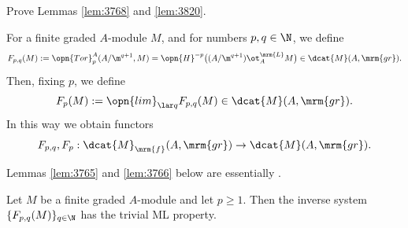 \begin{exer} \label{exer:3765}
Prove Lemmas \ref{lem:3768} and \ref{lem:3820}.
\end{exer}

For a finite graded $A$-module $M$, and for numbers $p, q \in \N$, we 
define \begin{equation} \label{eqn:3765}
F_{p, q}(M) := \opn{Tor}^A_p(A / \m^{q + 1}, M) = 
\opn{H}^{-p} \bigl(  (A / \m^{q + 1})  \ot^{\mrm{L}}_{A} M \bigr) 
\in \dcat{M}(A, \mrm{gr}) . 
\end{equation}
Then, fixing $p$, we define 
\begin{equation} \label{eqn:3766}
F_{p}(M) := \opn{lim}_{\lar q} F_{p, q}(M) \in \dcat{M}(A, \mrm{gr}) . 
\end{equation}
In this way we obtain functors 
\begin{equation} \label{eqn:5202}
F_{p, q}, F_{p} : \dcat{M}_{\mrm{f}}(A, \mrm{gr}) \to \dcat{M}(A, \mrm{gr}) .
\end{equation}

Lemmas \ref{lem:3765} and \ref{lem:3766} below are essentially
\cite[Lemma 6.4 and Proposition 6.5]{WuZh}. 

\begin{lem} \label{lem:3765}
Let $M$ be a finite graded $A$-module and let $p \geq 1$. Then the 
inverse system $\{ F_{p, q}(M) \}_{q \in \N}$ 
has the trivial ML property. 
\end{lem}

